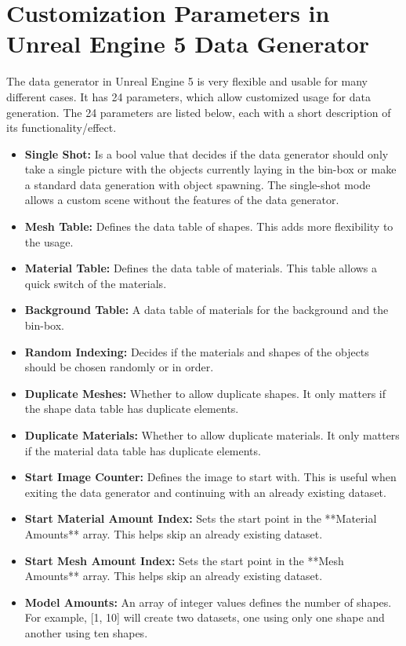 \chapter{Customization Parameters in Unreal Engine 5 Data Generator}
\label{appendix:custom-params-ue5}
	The data generator in Unreal Engine 5 is very flexible and usable for many different cases. It has 24 parameters, which allow customized usage for data generation. The 24 parameters are listed below, each with a short description of its functionality/effect.

	\begin{itemize}
		\item \textbf{Single Shot:} Is a bool value that decides if the data generator should only take a single picture with the objects currently laying in the bin-box or make a standard data generation with object spawning. The single-shot mode allows a custom scene without the features of the data generator.
		\item \textbf{Mesh Table:} Defines the data table of shapes. This adds more flexibility to the usage.
		\item \textbf{Material Table:} Defines the data table of materials. This table allows a quick switch of the materials.
		\item \textbf{Background Table:} A data table of materials for the background and the bin-box.
		\item \textbf{Random Indexing:} Decides if the materials and shapes of the objects should be chosen randomly or in order.
		\item \textbf{Duplicate Meshes:} Whether to allow duplicate shapes. It only matters if the shape data table has duplicate elements.
		\item \textbf{Duplicate Materials:} Whether to allow duplicate materials. It only matters if the material data table has duplicate elements.
		\item  \textbf{Start Image Counter:} Defines the image to start with. This is useful when exiting the data generator and continuing with an already existing dataset.
		\item \textbf{Start Material Amount Index:} Sets the start point in the **Material Amounts** array. This helps skip an already existing dataset.
		\item \textbf{Start Mesh Amount Index:} Sets the start point in the **Mesh Amounts** array. This helps skip an already existing dataset.
		\item \textbf{Model Amounts:} An array of integer values defines the number of shapes. For example, [1, 10] will create two datasets, one using only one shape and another using ten shapes.

\end{itemize}
